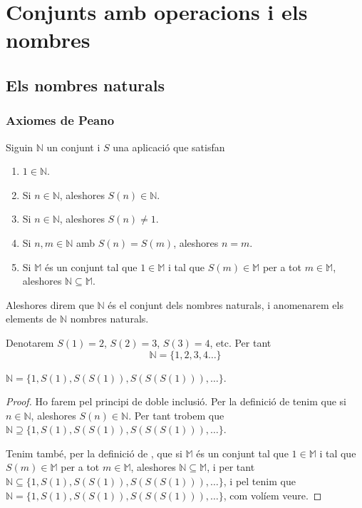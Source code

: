 \documentclass[../Apunts.tex]{subfiles}
\begin{document}
	\chapter{Conjunts amb operacions i els nombres}
	\section{Els nombres naturals}
	\subsection{Axiomes de Peano}
	\begin{definition}
		\label{def:nombres naturals}
		Siguin \(\mathbb{N}\) un conjunt i \(S\) una aplicació que satisfan
		\begin{enumerate}
			\item \(1\in\mathbb{N}\).
			\item Si \(n\in\mathbb{N}\), aleshores \(S(n)\in\mathbb{N}\).
			\item Si \(n\in\mathbb{N}\), aleshores \(S(n)\neq1\).
			\item Si \(n,m\in\mathbb{N}\) amb \(S(n)=S(m)\), aleshores \(n=m\).
			\item Si \(\mathbb{M}\) és un conjunt tal que \(1\in\mathbb{M}\) i tal que \(S(m)\in\mathbb{M}\) per a tot \(m\in\mathbb{M}\), aleshores \(\mathbb{N}\subseteq\mathbb{M}\).
		\end{enumerate}
		Aleshores direm que \(\mathbb{N}\) és el conjunt dels nombres naturals, i anomenarem els elements de \(\mathbb{N}\) nombres naturals.
	\end{definition}
	\begin{notation}
		Denotarem \(S(1)=2\), \(S(2)=3\), \(S(3)=4\), etc. Per tant
		\[\mathbb{N}=\{1,2,3,4\dots\}\]
	\end{notation}
	\begin{lemma}
		\label{lemma:primer element}
		\(\mathbb{N}=\{1,S(1),S(S(1)),S(S(S(1))),\dots\}\).
		\begin{proof}
			Ho farem pel principi de doble inclusió. Per la definició de  tenim que si \(n\in\mathbb{N}\), aleshores \(S(n)\in\mathbb{N}\). Per tant trobem que \(\mathbb{N}\supseteq\{1,S(1),S(S(1)),S(S(S(1))),\dots\}\).
			
			Tenim també, per la definició de , que si \(\mathbb{M}\) és un conjunt tal que \(1\in\mathbb{M}\) i tal que \(S(m)\in\mathbb{M}\) per a tot \(m\in\mathbb{M}\), aleshores \(\mathbb{N}\subseteq\mathbb{M}\), i per tant \(\mathbb{N}\subseteq\{1,S(1),S(S(1)),S(S(S(1))),\dots\}\), i pel  tenim que \(\mathbb{N}=\{1,S(1),S(S(1)),S(S(S(1))),\dots\}\), com volíem veure.
		\end{proof}
	\end{lemma}
\end{document}
